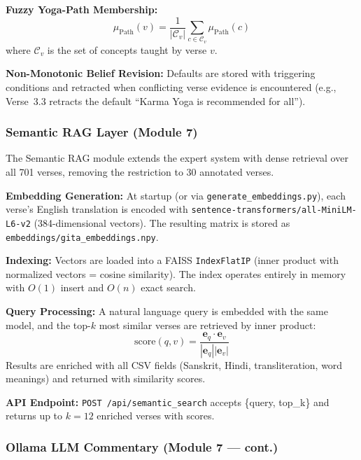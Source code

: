 \documentclass[conference]{IEEEtran}
\begin{document}
\textbf{Fuzzy Yoga-Path Membership:}
\begin{equation}
  \mu_{\text{Path}}(v) = \frac{1}{|\mathcal{C}_v|}
  \sum_{c \in \mathcal{C}_v} \mu_{\text{Path}}(c)
  \label{eq:fuzzy}
\end{equation}
where $\mathcal{C}_v$ is the set of concepts taught by verse $v$.

\textbf{Non-Monotonic Belief Revision:} Defaults are stored with triggering
conditions and retracted when conflicting verse evidence is encountered
(e.g., Verse~3.3 retracts the default ``Karma Yoga is recommended for all'').

\subsubsection{Semantic RAG Layer (Module 7)}

The Semantic RAG module extends the expert system with dense retrieval
over all 701 verses, removing the restriction to 30 annotated verses.

\textbf{Embedding Generation:} At startup (or via \texttt{generate\_embeddings.py}),
each verse's English translation is encoded with
\texttt{sentence-transformers/all-MiniLM-L6-v2} (384-dimensional vectors).
The resulting matrix is stored as \texttt{embeddings/gita\_embeddings.npy}.

\textbf{Indexing:} Vectors are loaded into a FAISS \texttt{IndexFlatIP}
(inner product with normalized vectors = cosine similarity). The index
operates entirely in memory with $O(1)$ insert and $O(n)$ exact search.

\textbf{Query Processing:} A natural language query is embedded with the
same model, and the top-$k$ most similar verses are retrieved by inner
product:
\begin{equation}
  \text{score}(q, v) = \frac{\mathbf{e}_q \cdot \mathbf{e}_v}
  {|\mathbf{e}_q||\mathbf{e}_v|}
  \label{eq:cosine}
\end{equation}
Results are enriched with all CSV fields (Sanskrit, Hindi, transliteration,
word meanings) and returned with similarity scores.

\textbf{API Endpoint:} \texttt{POST /api/semantic\_search} accepts
\{query, top\_k\} and returns up to $k = 12$ enriched verses with scores.

\subsubsection{Ollama LLM Commentary (Module 7 — cont.)}
\end{document}
